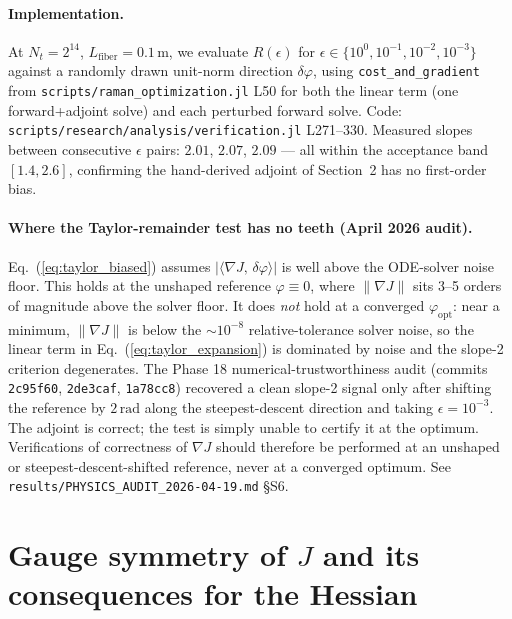 \documentclass[11pt]{article}
\begin{document}
\paragraph{Implementation.} At $N_t = 2^{14}$, $L_\text{fiber} = 0.1\,\mathrm{m}$,
we evaluate $R(\epsilon)$ for $\epsilon \in \{10^0, 10^{-1}, 10^{-2}, 10^{-3}\}$
against a randomly drawn unit-norm direction $\delta\varphi$, using
\texttt{cost\_and\_gradient} from \texttt{scripts/raman\_optimization.jl} L50
for both the linear term (one forward+adjoint solve) and each perturbed forward
solve. Code: \texttt{scripts/research/analysis/verification.jl} L271--330. Measured slopes
between consecutive $\epsilon$ pairs: $2.01$, $2.07$, $2.09$ — all within the
acceptance band $[1.4, 2.6]$, confirming the hand-derived adjoint of Section~2
has no first-order bias.

\paragraph{Where the Taylor-remainder test has no teeth (April 2026 audit).}
Eq.~(\ref{eq:taylor_biased}) assumes $|\langle \nabla J,\,\delta\varphi\rangle|$
is well above the ODE-solver noise floor. This holds at the unshaped
reference $\varphi \equiv 0$, where $\|\nabla J\|$ sits 3--5 orders of
magnitude above the solver floor. It does \emph{not} hold at a converged
$\varphi_\text{opt}$: near a minimum, $\|\nabla J\|$ is below the
$\sim 10^{-8}$ relative-tolerance solver noise, so the linear term in
Eq.~(\ref{eq:taylor_expansion}) is dominated by noise and the slope-2
criterion degenerates. The Phase 18 numerical-trustworthiness audit
(commits \texttt{2c95f60}, \texttt{2de3caf}, \texttt{1a78cc8}) recovered
a clean slope-2 signal only after shifting the reference by
$2\,\mathrm{rad}$ along the steepest-descent direction and taking
$\epsilon = 10^{-3}$. The adjoint is correct; the test is simply
unable to certify it at the optimum. Verifications of correctness of
$\nabla J$ should therefore be performed at an unshaped or
steepest-descent-shifted reference, never at a converged optimum.
See \texttt{results/PHYSICS\_AUDIT\_2026-04-19.md} §S6.

\section{Gauge symmetry of $J$ and its consequences for the Hessian}
\label{sec:gauge}
\end{document}
